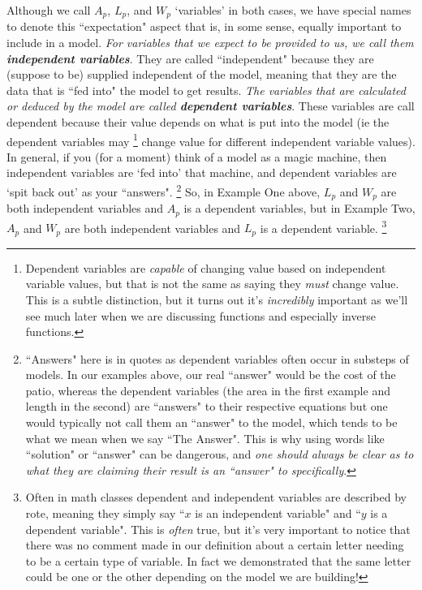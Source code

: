 Although we call $A_p$, $L_p$, and $W_p$ `variables' in both cases, we have special names to denote this ``expectation" aspect that is, in some sense, equally important to include in a model. \textit{For variables that we expect to be provided to us, we call them \textbf{independent variables}}. They are called ``independent" because they are (suppose to be) supplied independent of the model, meaning that they are the data that is ``fed into" the model to get results. \textit{The variables that are calculated or deduced by the model are called \textbf{dependent variables}}. These variables are call dependent because their value depends on what is put into the model (ie the dependent variables may%
\footnote{Dependent variables are \textit{capable} of changing value based on independent variable values, but that is not the same as saying they \textit{must} change value. This is a subtle distinction, but it turns out it's \textit{incredibly} important as we'll see much later when we are discussing functions and especially inverse functions.}
change value for different independent variable values). In general, if you (for a moment) think of a model as a magic machine, then independent variables are `fed into' that machine, and dependent variables are `spit back out' as your ``answers".%
\footnote{``Answers" here is in quotes as dependent variables often occur in substeps of models. In our examples above, our real ``answer" would be the cost of the patio, whereas the dependent variables (the area in the first example and length in the second) are ``answers" to their respective equations but one would typically not call them an ``answer" to the model, which tends to be what we mean when we say ``The Answer". This is why using words like ``solution" or ``answer" can be dangerous, and \textit{one should always be clear as to what they are claiming their result is an ``answer" to specifically}.}
So, in Example One above, $L_p$ and $W_p$ are both independent variables and $A_p$ is a dependent variables, but in Example Two, $A_p$ and $W_p$ are both independent variables and $L_p$ is a dependent variable.%
\footnote{Often in math classes dependent and independent variables are described by rote, meaning they simply say ``$x$ is an independent variable" and ``$y$ is a dependent variable". This is \textit{often} true, but it's very important to notice that there was no comment made in our definition about a certain letter needing to be a certain type of variable. In fact we demonstrated that the same letter could be one or the other depending on the model we are building!}

